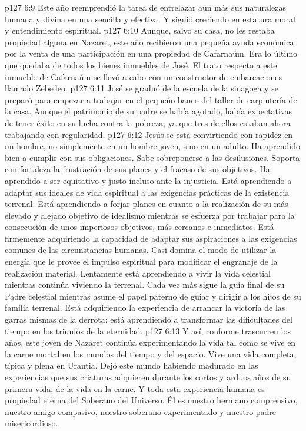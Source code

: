 \vs p127 6:9 Este año reemprendió la tarea de entrelazar aún más sus naturalezas humana y divina en una  sencilla y efectiva. Y siguió creciendo en estatura moral y entendimiento espiritual.
\vs p127 6:10 Aunque, salvo su casa, no les restaba propiedad alguna en Nazaret, este año recibieron una pequeña ayuda económica por la venta de una participación en una propiedad de Cafarnaúm. Era lo último que quedaba de todos los bienes inmuebles de José. El trato respecto a este inmueble de Cafarnaúm se llevó a cabo con un constructor de embarcaciones llamado Zebedeo.
\vs p127 6:11 José se graduó de la escuela de la sinagoga y se preparó para empezar a trabajar en el pequeño banco del taller de carpintería de la casa. Aunque el patrimonio de su padre se había agotado, había expectativas de tener éxito en su lucha contra la pobreza, ya que tres de ellos estaban ahora trabajando con regularidad.
\vs p127 6:12 \pc Jesús se está convirtiendo con rapidez en un hombre, no simplemente en un hombre joven, sino en un adulto. Ha aprendido bien a cumplir con sus obligaciones. Sabe sobreponerse a las desilusiones. Soporta con fortaleza la frustración de sus planes y el fracaso de sus objetivos. Ha aprendido a ser equitativo y justo incluso ante la injusticia. Está aprendiendo a adaptar sus ideales de vida espiritual a las exigencias prácticas de la existencia terrenal. Está aprendiendo a forjar planes en cuanto a la realización de su más elevado y alejado objetivo de idealismo mientras se esfuerza por trabajar para la consecución de unos imperiosos objetivos, más cercanos e inmediatos. Está firmemente adquiriendo la capacidad de adaptar sus aspiraciones a las exigencias comunes de las circunstancias humanas. Casi domina el modo de utilizar la energía que le provee el impulso espiritual para modificar el engranaje de la realización material. Lentamente está aprendiendo a vivir la vida celestial mientras continúa viviendo la terrenal. Cada vez más sigue la guía final de su Padre celestial mientras asume el papel paterno de guiar y dirigir a los hijos de su familia terrenal. Está adquiriendo la experiencia de arrancar la victoria de las garras mismas de la derrota; está aprendiendo a transformar las dificultades del tiempo en los triunfos de la eternidad.
\vs p127 6:13 \pc Y así, conforme trascurren los años, este joven de Nazaret continúa experimentando la vida tal como se vive en la carne mortal en los mundos del tiempo y del espacio. Vive una vida completa, típica y plena en Urantia. Dejó este mundo habiendo madurado en las experiencias que sus criaturas adquieren durante los cortos y arduos años de su primera vida, de la vida en la carne. Y toda esta experiencia humana es propiedad eterna del Soberano del Universo. Él es nuestro hermano comprensivo, nuestro amigo compasivo, nuestro soberano experimentado y nuestro padre misericordioso.
